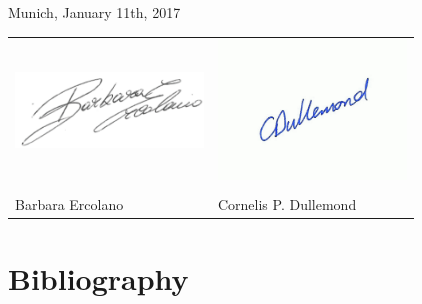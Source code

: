 \documentclass[10pt,fleqn,twoside]{article}
\begin{document}
\vfill

\noindent Munich, January 11th, 2017\\

\noindent\begin{tabular}{p{8.5cm}p{8.5cm}}
\includegraphics[width=50mm]{signature_erc-eps-converted-to.pdf} & 
\includegraphics[width=50mm]{signature_dul-eps-converted-to.pdf} \\
\mbox{}\vspace{1em}\mbox{} & \\
Barbara Ercolano & Cornelis P. Dullemond \\
\end{tabular}
% 



%
\pagebreak[4]

%


\section{Bibliography}

\begingroup
\renewcommand{\section}[2]{}%


\endgroup
\end{document}
